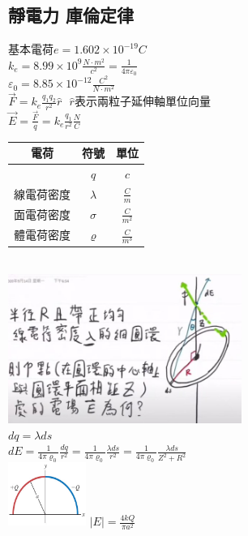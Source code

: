 \documentclass[a4paper,10pt,twocolumn,oneside]{article}
\begin{document}
\begin{normalsize}
\subsection{靜電力 庫倫定律}
$基本電荷 e=1.602\times10^{-19}C$ \\
$k_{e}=8.99\times 10^9 \frac{N\cdot m^2}{c^2}=\frac{1}{4 \pi \varepsilon_{0}}$ \\
$\varepsilon_{0}=8.85 \times 10^{-12} \frac{C^2}{N\cdot m^2}$ \\
$\vec{F}=k_{e}\frac{q_{1}q_{2}}{r^2}\hat{r}$  $ $
$ \hat{r}表示兩粒子延伸軸單位向量$ \\
$\vec{E}=\frac{\vec{F}}{q}=k_{e}\frac{q_{1}}{r^2}\frac{N}{C}$ \\
\begin{tabular}{|c|c|c|}
    \hline
    電荷&符號&單位 \\
    \hline
    & $q$ & $c$ \\
    \hline
    線電荷密度& $ \lambda $ & $ \frac{C}{m} $ \\
    \hline
    面電荷密度& $ \sigma $ & $ \frac{C}{m^2} $ \\
    \hline
    體電荷密度& $ \varrho $ & $ \frac{C}{m^3} $ \\
    \hline
\end{tabular} \\
\includegraphics[width=3in]{RingAndCharge.jpg}\\
$dq=\lambda ds$ \\
$dE=\frac{1}{4 \pi \varrho_{0}}\frac{dq}{r^2}=\frac{1}{4 \pi \varrho_{0}}\frac{\lambda ds}{r^2}=\frac{1}{4 \pi \varrho_{0}}\frac{\lambda ds}{Z^2 + R^2}$\\
\includegraphics[width=1in]{21-98.jpg} 
$ |E|=\frac{4kQ}{\pi a^2} $\\

\\

\end{normalsize}
\end{document}
